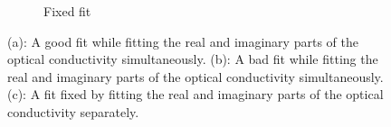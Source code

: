 \begin{figure}
\begin{subfigure}{0.49\textwidth}
        \caption{Fixed fit}
        \label{fig:drude_fit_bad}
    \end{subfigure}
    \caption{(a): A good fit while fitting the real and imaginary parts of the optical conductivity
    simultaneously. (b): A bad fit while fitting the real and imaginary parts of the optical
    conductivity simultaneously. (c): A fit fixed by fitting the real and imaginary parts of the
    optical conductivity separately.}
\end{figure}
